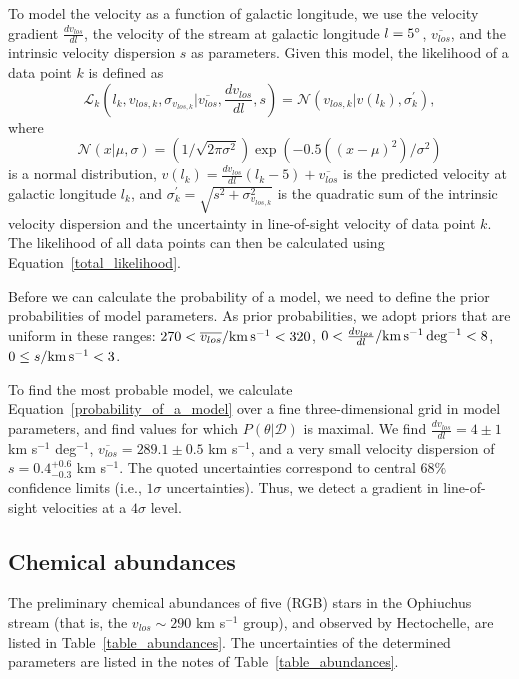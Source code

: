 \documentclass[iop]{emulateapj}
\begin{document}
To model the velocity as a function of galactic longitude, we use the velocity
gradient $\frac{dv_{los}}{dl}$, the velocity of the stream at galactic longitude
$l=5\mbox{$^\circ$}$, $\overline{v_{los}}$, and the intrinsic velocity dispersion $s$ as
parameters. Given this model, the likelihood of a data point $k$ is defined as
\begin{equation}
    \mathcal{L}_k(l_k, v_{los,k}, \sigma_{v_{los, k}} | \overline{v_{los}}, \frac{dv_{los}}{dl}, s) = \mathcal{N}(v_{los,k} | v(l_k), \sigma^\prime_k),
\end{equation}
where
\begin{equation}
\mathcal{N}(x|\mu,\sigma)=(1/\sqrt{2\pi\sigma^2})\exp(-0.5((x-\mu)^2)/\sigma^2)
\end{equation}
is a normal distribution,
$v(l_k) = \frac{dv_{los}}{dl}(l_k - 5) +\overline{v_{los}}$ is the predicted
velocity at galactic longitude $l_k$, and
$\sigma^\prime_k=\sqrt{s^2 + \sigma^2_{v_{los, k}}}$ is the quadratic sum of the
intrinsic velocity dispersion and the uncertainty in line-of-sight velocity of
data point $k$. The likelihood of all data points can then be calculated using
Equation~\ref{total_likelihood}.

Before we can calculate the probability of a model, we need to define the prior
probabilities of model parameters. As prior probabilities, we adopt priors that
are uniform in these ranges: $270 < \overline{v_{los}}/{\rm km\, s^{-1}} < 320$,
$0 < \frac{dv_{los}}{dl}/{\rm km\, s^{-1}\, deg^{-1}} < 8$,
$0 \leq s/{\rm km\, s^{-1}} < 3$.

To find the most probable model, we calculate
Equation~\ref{probability_of_a_model} over a fine three-dimensional grid in
model parameters, and find values for which $P(\theta | \mathcal{D})$ is
maximal. We find $\frac{dv_{los}}{dl}=4\pm1$ km s$^{-1}$ deg$^{-1}$,
$\overline{v_{los}}=289.1\pm0.5$ km s$^{-1}$, and a very small velocity
dispersion of $s=0.4_{-0.3}^{+0.6}$ km s$^{-1}$. The quoted uncertainties
correspond to central $68\%$ confidence limits (i.e., $1\sigma$ uncertainties).
Thus, we detect a gradient in line-of-sight velocities at a $4\sigma$ level.

\subsection{Chemical abundances\label{abundances}}

The preliminary chemical abundances of five (RGB) stars in the Ophiuchus stream
(that is, the $v_{los}\sim290$ km s$^{-1}$ group), and observed by Hectochelle, 
are listed in Table~\ref{table_abundances}. The uncertainties of the determined
parameters are listed in the notes of Table~\ref{table_abundances}.
\end{document}
